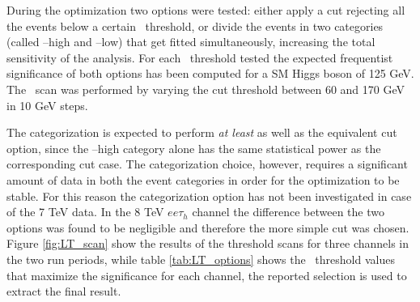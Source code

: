 During the optimization two options were tested: either apply a cut rejecting all the events below a certain \LT\ threshold, or divide the events in two categories (called \LT--high and \LT--low) that get fitted simultaneously, increasing the total sensitivity of the analysis. 
For each \LT \ threshold tested the expected frequentist significance of both options has been computed for a SM Higgs boson of 125 GeV. The \LT\ scan was performed by varying the cut threshold between 60 and 170 GeV in 10 GeV steps. 

The categorization is expected to perform \emph{at least} as well as the equivalent cut option, since the \LT--high category alone has the same statistical power as the corresponding cut case. The categorization choice, however, requires a significant amount of data in both the event categories in order for the optimization to be stable. For this reason the categorization option has not been investigated in case of the 7 TeV data. In the 8 TeV $ee\tau_h$ channel the difference between the two options was found to be negligible and therefore the more simple cut was chosen. Figure \ref{fig:LT_scan} show the results of the threshold scans for three channels in the two run periods, while table \ref{tab:LT_options} shows the \LT\ threshold values that maximize the significance for each channel, the reported selection is used to extract the final result.


